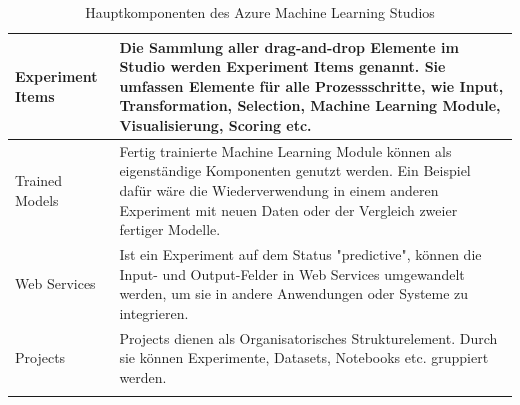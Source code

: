 \begin{longtable}[H]{|p{}|p{14cm}|}
\hline
Experiment Items & Die Sammlung aller drag-and-drop Elemente im Studio werden Experiment Items genannt. Sie umfassen Elemente für alle Prozessschritte, wie Input, Transformation, Selection, Machine Learning Module, Visualisierung, Scoring etc.\\
\hline
Trained Models & Fertig trainierte Machine Learning Module können als eigenständige Komponenten genutzt werden. Ein Beispiel dafür wäre die Wiederverwendung in einem anderen Experiment mit neuen Daten oder der Vergleich zweier fertiger Modelle.\\
\hline
Web Services & Ist ein Experiment auf dem Status "predictive", können die Input- und Output-Felder in Web Services umgewandelt werden, um sie in andere Anwendungen oder Systeme zu integrieren.\\
\hline
Projects & Projects dienen als Organisatorisches Strukturelement. Durch sie können Experimente, Datasets, Notebooks etc. gruppiert werden. \\
\hline
\caption{Hauptkomponenten des Azure Machine Learning Studios}
\label{tab:azuremlcomponents}
\end{longtable}

